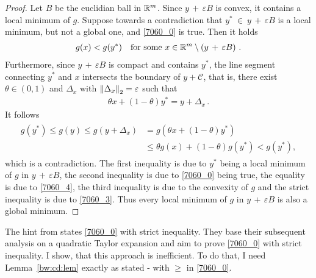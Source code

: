\begin{proof}
  Let $B$ be the euclidian ball in $\mathbb{R}^m$.
  Since 
  $
  y
  \,
  +
  \,
  \varepsilon
  B
  $
  is convex, it contains a 
  local minimum  
  of $g$.
  Suppose towards a contradiction that
  $
    y^* 
    \ 
    \in 
    \ 
  y
  \,
  +
  \,
  \varepsilon
  B
  $
  is a local minimum, but not a global one, and
  \eqref{7060_0} is true.
  Then it holds
  \begin{gather}
    \label{7060_3}
    g(x) < g(y^*)
    \quad
    \text{for some}\ 
    x 
    \in 
    \R^m 
    \setminus 
    \left( 
  y
  \,
  +
  \,
  \varepsilon
  B
    \right)
  \,.
  \end{gather}
  Furthermore, since 
  $
  y
  \,
  +
  \,
  \varepsilon
  B
  $ is compact and contains $y^*$,
  the line segment connecting 
  $y^*$ and $x$
  intersects the boundary of 
  $y + \mathcal{C}$, that is,
  there exist
  $
    \theta \in (0,1)
  $
  and 
  $
    \Delta_x
  $
  with 
  $
    \left\lVert\Delta_x\right\rVert_2=\varepsilon
  $
  such that
  \begin{gather}
    \label{7060_4}
    \theta x + (1 - \theta) y^* = y + \Delta_x
    \,.
  \end{gather}
    It follows
    \begin{align}
      \label{7060_5}
      \begin{split}
      g(y^*)
      \le
      g(y)
      \le
      g(y + \Delta_x)
      &=
      g(
        \theta x + (1 - \theta) y^*
      )
      \\
      &\le
      \theta g(x)
      + 
      (1 - \theta)
      g(y^*)
      <
      g(y^*)
      ,
      \end{split}
    \end{align}
    which is a contradiction.
    The first inequality is due to
    $y^*$ being a local minimum of $g$ in
    $
  y
  \,
  +
  \,
  \varepsilon
  B
    $,
    the second inequality is due to  
    \eqref{7060_0} being true,
    the equality is due to \eqref{7060_4},
    the third inequality is due to the convexity of $g$
    and the strict inequality is due to \eqref{7060_3}.
    Thus every local minimum of $g$ in
    $
  y
  \,
  +
  \,
  \varepsilon
  B
    $
    is also a global minimum.
\end{proof}
\begin{remark}
  The hint from \cite[page 22]{Wang2019}
  states
  \eqref{7060_0}
  with strict inequality.
  They base their subsequent analysis on a quadratic Taylor expansion and aim to prove \eqref{7060_0} with strict inequality.
  I show, that this approach is inefficient.  
  To do that, I need Lemma~\ref{bw:cd:lem} exactly as stated - with $\ge$ in \eqref{7060_0}.
\end{remark}
